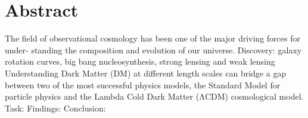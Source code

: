 \documentclass[ucdthesis.tex]{subfiles}
\begin{document}
    
    

    \doublespacing
		\section*{Abstract} 


		The field of observational cosmology has been one of the major driving
		forces for under- standing the composition and evolution of our universe.
		Discovery: galaxy rotation curves, big bang nucleosynthesis, strong lensing
		and weak lensing
		Understanding Dark Matter (DM) at different length scales can bridge a gap
		between two of the most successful physics models, the Standard Model for
		particle physics and the Lambda Cold Dark Matter (ΛCDM) cosmological model.
		Task:
		Findings:
		Conclusion:

       
    \newpage
    
\end{document}
